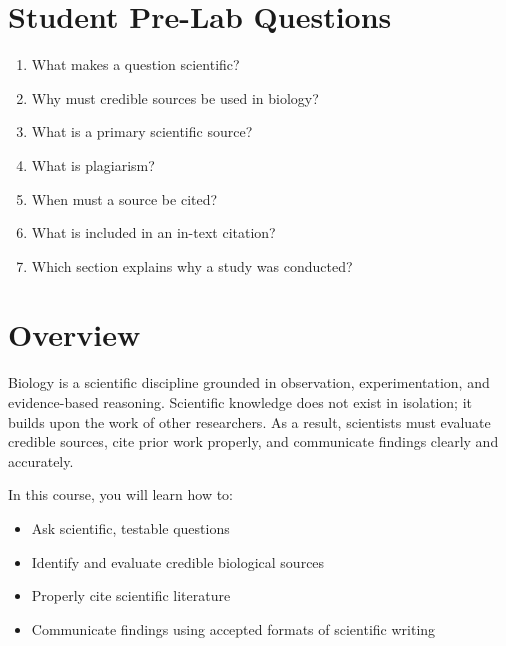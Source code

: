 \documentclass[
  letterpaper,
  DIV=11,
  numbers=noendperiod]{scrreprt}
\begin{document}

\section*{\texorpdfstring{\textbf{Student Pre-Lab
Questions}}{Student Pre-Lab Questions}}\label{student-pre-lab-questions}


\begin{enumerate}
\def\labelenumi{\arabic{enumi}.}
\item
  What makes a question scientific?
\item
  Why must credible sources be used in biology?
\item
  What is a primary scientific source?
\item
  What is plagiarism?
\item
  When must a source be cited?
\item
  What is included in an in-text citation?
\item
  Which section explains why a study was conducted?
\end{enumerate}

\section*{\texorpdfstring{\textbf{Overview}}{Overview}}\label{overview}


Biology is a scientific discipline grounded in observation,
experimentation, and evidence-based reasoning. Scientific knowledge does
not exist in isolation; it builds upon the work of other researchers. As
a result, scientists must evaluate credible sources, cite prior work
properly, and communicate findings clearly and accurately.

In this course, you will learn how to:

\begin{itemize}
\item
  Ask scientific, testable questions
\item
  Identify and evaluate credible biological sources
\item
  Properly cite scientific literature
\item
  Communicate findings using accepted formats of scientific writing
\end{itemize}
\end{document}
